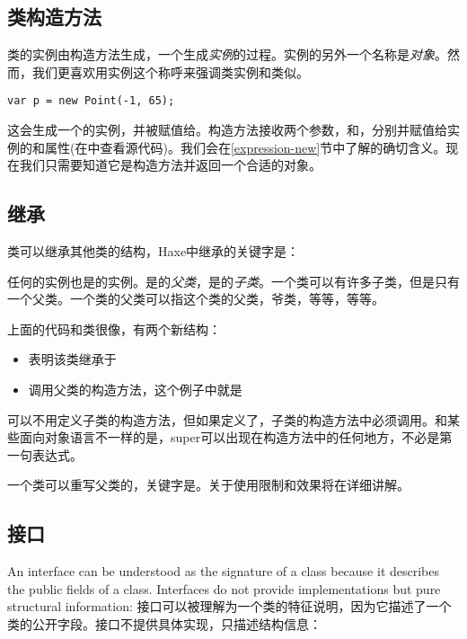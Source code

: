 \subsection{类构造方法}
\label{types-class-constructor}

类的实例由构造方法生成，一个生成\emph{实例}的过程。实例的另外一个名称是\emph{对象}。然而，我们更喜欢用实例这个称呼来强调类实例和类似。

\begin{lstlisting}
var p = new Point(-1, 65);
\end{lstlisting}
这会生成一个的实例，并被赋值给。构造方法接收两个参数，和，分别并赋值给实例的和属性(在中查看源代码)。我们会在\ref{expression-new}节中了解的确切含义。现在我们只需要知道它是构造方法并返回一个合适的对象。


\subsection{继承}
\label{types-class-inheritance}

类可以继承其他类的结构，Haxe中继承的关键字是：

任何的实例也是的实例。是的\emph{父类}，是的\emph{子类}。一个类可以有许多子类，但是只有一个父类。一个类的父类可以指这个类的父类，爷类，等等，等等。

上面的代码和类很像，有两个新结构：
\begin{itemize}
 \item {}表明该类继承于
 \item {}调用父类的构造方法，这个例子中就是
\end{itemize}
可以不用定义子类的构造方法，但如果定义了，子类的构造方法中必须调用。和某些面向对象语言不一样的是，super可以出现在构造方法中的任何地方，不必是第一句表达式。

一个类可以重写父类的，关键字是。关于使用限制和效果将在详细讲解。


\subsection{接口}
\label{types-interfaces}

An interface can be understood as the signature of a class because it describes the public fields of a class. Interfaces do not provide implementations but pure structural information:
接口可以被理解为一个类的特征说明，因为它描述了一个类的公开字段。接口不提供具体实现，只描述结构信息：

